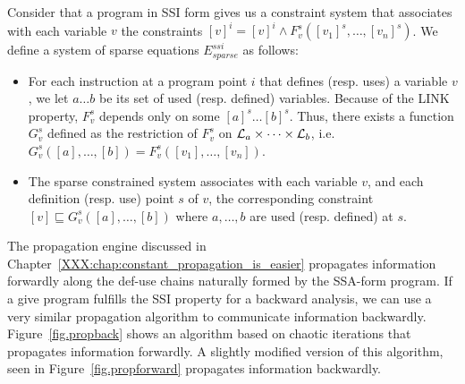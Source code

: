 \begin{definition}
\label{def:ssi_eq}
Consider that a program in SSI form gives us a constraint system that associates with each variable $v$ the constraints $[v]^i = [v]^i \wedge F_v^s([v_1]^s, \dots, [v_n]^s)$. We define a system of sparse equations $E^{ssi}_{sparse}$ as follows:

\begin{itemize}

\item For each instruction at a program point $i$ that defines (resp. uses) a variable $v$, we let $a \dots b$ be its set of used (resp. defined) variables. Because of the LINK property, $F^s_v$ depends only on some $[a]^s \dots [b]^s$.
Thus, there exists a function $G^s_v$ defined as the restriction of $F^s_v$ on ${\cal L}_a\times \dots \times{\cal L}_b$, i.e. $G^s_v([a], \dots, [b]) = F^s_v([v_1],\dots, [v_n])$.

\item The sparse constrained system associates with each variable $v$, and each definition (resp. use) point $s$ of $v$, the corresponding constraint $[v]  \sqsubseteq G_v^s([a], \ldots, [b])$ where $a,\dots, b$ are used (resp. defined) at $s$.
\end{itemize}

\end{definition}

The propagation engine discussed in Chapter~\ref{XXX:chap:constant_propagation_is_easier} propagates information forwardly along the def-use chains naturally formed by the SSA-form program.
If a give program fulfills the SSI property for a backward analysis, we can use a very similar propagation algorithm to communicate information backwardly.
Figure~\ref{fig.propback} shows an algorithm based on chaotic iterations that propagates information forwardly.
A slightly modified version of this algorithm, seen in Figure~\ref{fig.propforward} propagates information backwardly.

\def\1{\qquad}
\def\2{\1\1}
\def\3{\2\1}
\def\4{\2\2}
\def\5{\3\2}
\def\6{\4\2}
\def\7{\5\2}
\def\8{\6\2}
\def\9{\7\2}
\def\If{{\sf  if }}
\def\Let{{\sf  let }}
\def\Then{{\sf  then }}
\def\Else{{\sf  else}}
\def\Foreach{{\sf foreach }}
\def\For{{\sf for }}
\def\While{{\sf while }}


